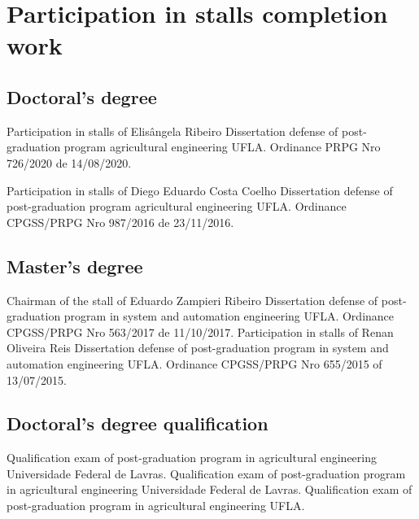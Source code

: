\documentclass[11pt,a4paper,sans]{moderncv} %
\begin{document}
\section{Participation in stalls completion work}

\subsection{Doctoral's degree}

			{Participation in stalls of Elisângela Ribeiro}
			{Dissertation defense of post-graduation program agricultural engineering}{}
			{UFLA. Ordinance PRPG Nro 726/2020 de 14/08/2020.}

			{Participation in stalls of Diego Eduardo Costa Coelho}
			{Dissertation defense of post-graduation program agricultural engineering}{}
			{UFLA. Ordinance CPGSS/PRPG Nro 987/2016 de 23/11/2016.}

			
\subsection{Master's degree}
			{Chairman of the stall of Eduardo Zampieri Ribeiro}
			{Dissertation defense of post-graduation program  in system and automation engineering }{}
			{UFLA. Ordinance CPGSS/PRPG Nro 563/2017 de 11/10/2017.}
			{Participation in stalls of Renan Oliveira Reis}
			{Dissertation defense of post-graduation program  in system and automation engineering }{}
			{UFLA. Ordinance CPGSS/PRPG Nro 655/2015 of 13/07/2015.}

\subsection{Doctoral's degree qualification}
			{}
			{Qualification exam of post-graduation program  in agricultural engineering}{}
			{Universidade Federal de Lavras.}
			{}
			{Qualification exam of post-graduation program  in agricultural engineering}{}
			{Universidade Federal de Lavras.}
			{}
			{Qualification exam of post-graduation program  in agricultural engineering}{}
			{UFLA. }
\end{document}
